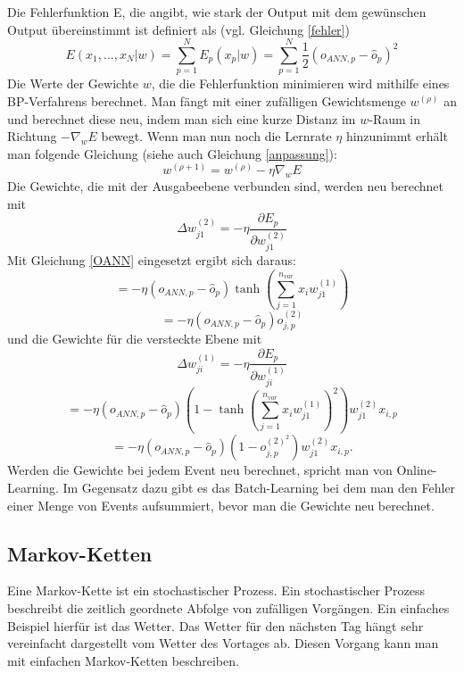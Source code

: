 \documentclass[12pt]{article}
\begin{document}
Die Fehlerfunktion E, die angibt, wie stark der Output mit dem gewünschen Output übereinstimmt ist definiert als (vgl. Gleichung \ref{fehler})
\begin{equation}E(x_1,...,x_N|w)=\sum_{p=1}^N E_p(x_p|w)=\sum^N_{p=1}\frac{1}{2}(o_{ANN,p}-\hat{o}_p)^2\end{equation}
Die Werte der Gewichte $w$, die die Fehlerfunktion minimieren wird mithilfe eines BP-Verfahrens berechnet. Man fängt mit einer zufälligen Gewichtsmenge $w^{(\rho)}$ an und berechnet diese neu, indem man sich eine kurze Distanz im $w$-Raum in Richtung $-\nabla_wE$ bewegt. Wenn man nun noch die Lernrate $\eta$ hinzunimmt erhält man folgende Gleichung (siehe auch Gleichung \ref{anpassung}):
\begin{equation}w^{(\rho+1)}=w^{(\rho)}-\eta\nabla_wE\end{equation}
Die Gewichte, die mit der Ausgabeebene verbunden sind, werden neu berechnet mit 
\begin{equation}\Delta w_{j1}^{(2)}=-\eta\frac{\partial E_p}{\partial w_{j1}^{(2)}}\end{equation}
Mit Gleichung \ref{OANN} eingesetzt ergibt sich daraus:
\begin{equation}=-\eta(o_{ANN,p}-\hat{o}_p)\tanh\left(\sum^{n_{var}}_{j=1}x_iw_{j1}^{(1)}\right)\end{equation}
\begin{equation}=-\eta(o_{ANN,p}-\hat{o}_p)o^{(2)}_{j,p}\end{equation}
und die Gewichte für die versteckte Ebene mit
\begin{equation}\Delta w_{ji}^{(1)}=-\eta\frac{\partial E_p}{\partial w_{ji}^{(1)}}\end{equation}
\begin{equation}=-\eta(o_{ANN,p}-\hat{o}_p)\left(1-\tanh\left(\sum^{n_{var}}_{j=1}x_iw_{j1}^{(1)}\right)^2\right)w_{j1}^{(2)}x_{i,p}\end{equation}
\begin{equation}=-\eta(o_{ANN,p}-\hat{o}_p)(1-o^{(2)^2}_{j,p})w_{j1}^{(2)}x_{i,p}.\end{equation}
Werden die Gewichte bei jedem Event neu berechnet, spricht man von Online-Learning. Im Gegensatz dazu gibt es das Batch-Learning bei dem man den Fehler einer Menge von Events aufsummiert, bevor man die Gewichte neu berechnet.
	\subsection{Markov-Ketten}
	Eine Markov-Kette ist ein stochastischer Prozess. Ein stochastischer Prozess beschreibt die zeitlich geordnete Abfolge von zufälligen Vorgängen. Ein einfaches Beispiel hierfür ist das Wetter. Das Wetter für den nächsten Tag hängt sehr vereinfacht dargestellt vom Wetter des Vortages ab. Diesen Vorgang kann man mit einfachen Markov-Ketten beschreiben.
\end{document}
